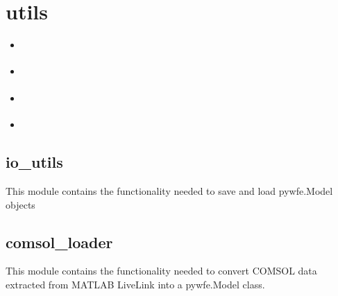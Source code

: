 \documentclass[letterpaper,10pt,english]{sphinxmanual}
\begin{document}
\section{utils}
\label{\detokenize{utils:utils}}\label{\detokenize{utils::doc}}
\begin{sphinxShadowBox}
\begin{itemize}
\item {} 
\sphinxAtStartPar
{}\label{\detokenize{utils:id1}}{\hyperref[\detokenize{utils:io-utils}]{}}

\item {} 
\sphinxAtStartPar
{}\label{\detokenize{utils:id2}}{\hyperref[\detokenize{utils:comsol-loader}]{}}

\item {} 
\sphinxAtStartPar
{}\label{\detokenize{utils:id3}}{\hyperref[\detokenize{utils:frequency-sweep}]{}}

\item {} 
\sphinxAtStartPar
{}\label{\detokenize{utils:id4}}{\hyperref[\detokenize{utils:modal-assurance}]{}}

\end{itemize}
\end{sphinxShadowBox}
\label{\detokenize{utils:module-pywfe.utils.io_utils}}

\subsection{io\_utils}
\label{\detokenize{utils:io-utils}}
\sphinxAtStartPar
This module contains the functionality needed to save and load pywfe.Model objects
\label{\detokenize{utils:module-pywfe.utils.comsol_loader}}

\subsection{comsol\_loader}
\label{\detokenize{utils:comsol-loader}}
\sphinxAtStartPar
This module contains the functionality needed to convert COMSOL data
extracted from MATLAB LiveLink into a pywfe.Model class.
\end{document}
